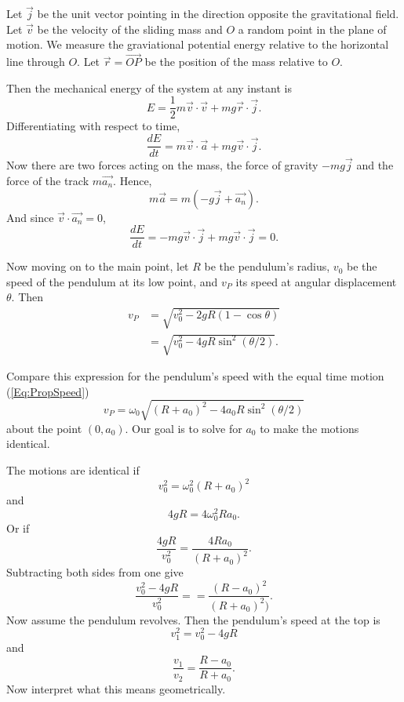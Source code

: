 \documentclass{ximera}
\begin{document}
Let $\overrightarrow{j}$ be the unit vector pointing in the direction opposite the gravitational field. Let $\overrightarrow{v}$ be the velocity of the sliding mass and $O$ a random point in the plane of motion. We measure the graviational potential energy relative to the horizontal line through $O$. Let $\overrightarrow{r} = \overrightarrow{OP}$ be the position of the mass relative to $O$.

Then the mechanical energy of the system at any instant is
\[
        E = \frac{1}{2}m \overrightarrow{v} \cdot \overrightarrow{v} + mg \overrightarrow{r}\cdot \overrightarrow{j} .
\] 
Differentiating with respect to time,
\[
     \frac{dE}{dt} = m\overrightarrow{v} \cdot \overrightarrow{a}  + m g \overrightarrow{v} \cdot \overrightarrow{j} .
\]
Now there are two forces acting on the mass, the force of gravity $-mg\overrightarrow{j}$  and the force of the track $m \overrightarrow{a_n}$. Hence, 
\[
   m\overrightarrow{a} = m \left(    -g\overrightarrow{j} + \overrightarrow{a_n}   \right) . 
\]
And since $\overrightarrow{v}\cdot \overrightarrow{a_n}=0$,
\[
    \frac{dE}{dt} = -mg \overrightarrow{v}\cdot \overrightarrow{j} + mg \overrightarrow{v} \cdot \overrightarrow{j} = 0.
\]


Now moving on to the main point, let $R$ be the pendulum's radius, $v_0$ be the speed of the pendulum at its low point, and $v_P$ its speed at angular displacement $\theta$. Then
\begin{align*}
    v_P    &= \sqrt{v_0^2 - 2gR(1-\cos\theta)}  \\
          &= \sqrt{v_0^2 - 4gR\sin^2 (\theta/2)} .
\end{align*}

Compare this expression for the pendulum's speed with the equal time motion (\ref{Eq:PropSpeed}) 
\[
    v_P  = \omega_0 \sqrt{(R+a_0)^2 - 4a_0R\sin^2(\theta/2)}
\]
about the point $(0,a_0)$. Our goal is to solve for $a_0$ to make the motions identical.

The motions are identical if
\[
     v_0^2 = \omega_0^2 (R+a_0)^2  
\]
and
\[
      4gR = 4\omega_0^2 Ra_0 .
\]
Or if
\[
    \frac{4gR}{v_0^2}    = \frac{4Ra_0}{(R+a_0)^2}      .
\]
Subtracting both sides from one give
\[
         \frac{v_0^2 - 4gR}{v_0^2} =  = \frac{(R - a_0)^2}{(R+a_0)^2)}  .
\]
Now assume the pendulum revolves. Then the pendulum's speed at the top is
\[
      v_1^2 = v_0^2 - 4gR 
\]
and
\[
    \frac{v_1}{v_2} = \frac{R-a_0}{R+a_0} .
\]
Now interpret what this means geometrically.
\end{document}
